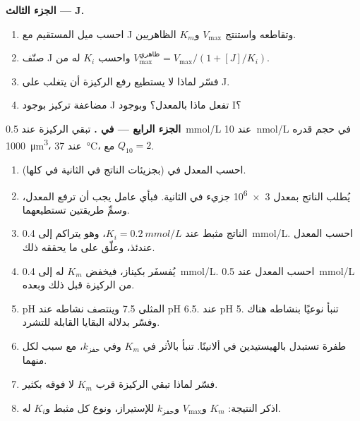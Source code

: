 \begin{problem}
\medskip
\noindent\textbf{الجزء الثالث ---  J.}
\begin{enumerate}[resume]
  \item احسب ميل المستقيم مع J وتقاطعه واستنتج $V_{\max}$ و$K_m$
        الظاهريين.
  \item صنّف J واحسب $K_i$ له من $V_{\max}^{\text{ظاهري}} =
        V_{\max}/(1 + [J]/K_i)$.
  \item فسّر لماذا لا يستطيع رفع الركيزة أن يتغلب على J.
  \item مضاعفة تركيز  بوجود J تفعل ماذا بالمعدل؟ وبوجود I؟
\end{enumerate}

\medskip
\noindent\textbf{الجزء الرابع --- في .}
تبقي  الركيزة عند \qty{0.5}{mmol/L}  عند
\qty{10}{nmol/L} في حجم قدره \qty{1000}{\micro m^3}، عند
\qty{37}{\celsius}، مع $Q_{10} = 2$.
\begin{enumerate}[resume]
  \item احسب المعدل في  (بجزيئات الناتج في الثانية في 
        كلها).
  \item يُطلب الناتج بمعدل \qty{3e6}{} جزيء في الثانية. فبأي عامل
        يجب أن ترفع  المعدل، وسمِّ طريقتين تستطيعهما.
  \item الناتج مثبط   عند $K_i = \qty{0.2}{mmol/L}$،
        وهو يتراكم إلى \qty{0.4}{mmol/L}. احسب المعدل عندئذ، وعلّق
        على ما يحققه ذلك.
  \item يُفسفَر  بكيناز، فيخفض $K_m$ له إلى \qty{0.4}{mmol/L}.
        احسب المعدل عند \qty{0.5}{mmol/L} من الركيزة قبل ذلك وبعده.
  \item pH المثلى  7.5 وينتصف نشاطه عند pH 6.5. 
        عند pH 5. تنبأ نوعيًا بنشاطه هناك وفسّر بدلالة البقايا
        القابلة للتشرد.
  \item طفرة تستبدل بالهيستيدين في  ألانينًا. تنبأ
        بالأثر في $K_m$ وفي $k_{\text{حفز}}$، مع سبب لكل منهما.
  \item فسّر لماذا تبقي  الركيزة قرب $K_m$ لا فوقه بكثير.
  \item اذكر النتيجة: $K_m$ و$V_{\max}$ و$k_{\text{حفز}}$ للإستيراز،
        ونوع كل مثبط و$K_i$ له.
\end{enumerate}
\end{problem}
